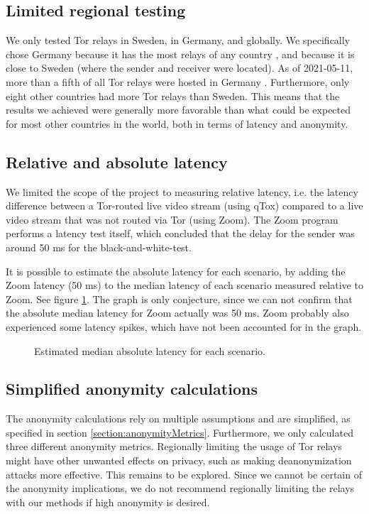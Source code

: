 \documentclass{kththesis}
\begin{document}
\subsection{Limited regional testing}
We only tested Tor relays in Sweden, in Germany, and globally. We specifically chose Germany because it has the most relays of any country \parencite{TorRelaysByCountry}, and because it is close to Sweden (where the sender and receiver were located). As of 2021-05-11, more than a fifth of all Tor relays were hosted in Germany \parencite{TotalAmountTorRelays}. Furthermore, only eight other countries had more Tor relays than Sweden. This means that the results we achieved were generally more favorable than what could be expected for most other countries in the world, both in terms of latency and anonymity.

\subsection{Relative and absolute latency}
We limited the scope of the project to measuring relative latency, i.e. the latency difference between a Tor-routed live video stream (using qTox) compared to a live video stream that was not routed via Tor (using Zoom). The Zoom program performs a latency test itself, which concluded that the delay for the sender was around 50 ms for the black-and-white-test.

It is possible to estimate the absolute latency for each scenario, by adding the Zoom latency (50 ms) to the median latency of each scenario measured relative to Zoom. See figure \ref{fig:absoluteLatency}. The graph is only conjecture, since we can not confirm that the absolute median latency for Zoom actually was 50 ms. Zoom probably also experienced some latency spikes, which have not been accounted for in the graph.

\begin{figure}[!htb]
    \centering
    
    \caption{Estimated median absolute latency for each scenario.}
    \label{fig:absoluteLatency}
\end{figure}

\subsection{Simplified anonymity calculations}
The anonymity calculations rely on multiple assumptions and are simplified, as specified in section \ref{section:anonymityMetrics}. Furthermore, we only calculated three different anonymity metrics. Regionally limiting the usage of Tor relays might have other unwanted effects on privacy, such as making deanonymization attacks more effective. This remains to be explored. Since we cannot be certain of the anonymity implications, we do not recommend regionally limiting the relays with our methods if high anonymity is desired.
\end{document}
